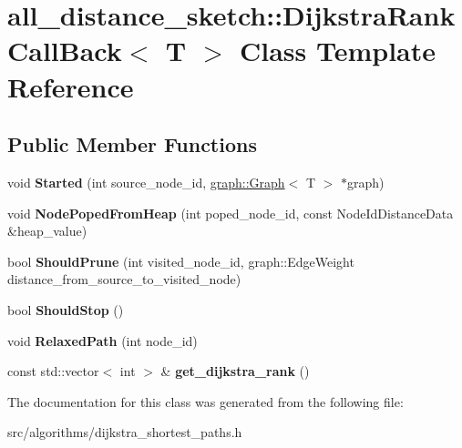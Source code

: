 \hypertarget{classall__distance__sketch_1_1DijkstraRankCallBack}{}\section{all\+\_\+distance\+\_\+sketch\+:\+:Dijkstra\+Rank\+Call\+Back$<$ T $>$ Class Template Reference}
\label{classall__distance__sketch_1_1DijkstraRankCallBack}
\subsection*{Public Member Functions}
\begin{DoxyCompactItemize}
\item 
\hypertarget{classall__distance__sketch_1_1DijkstraRankCallBack_a7a4c681a870394604e05cdf064df78c8}{}void {\bfseries Started} (int source\+\_\+node\+\_\+id, \hyperlink{classall__distance__sketch_1_1graph_1_1Graph}{graph\+::\+Graph}$<$ T $>$ $\ast$graph)\label{classall__distance__sketch_1_1DijkstraRankCallBack_a7a4c681a870394604e05cdf064df78c8}

\item 
\hypertarget{classall__distance__sketch_1_1DijkstraRankCallBack_ace8ff96d4d857a62ddd7aaab0dedc810}{}void {\bfseries Node\+Poped\+From\+Heap} (int poped\+\_\+node\+\_\+id, const Node\+Id\+Distance\+Data \&heap\+\_\+value)\label{classall__distance__sketch_1_1DijkstraRankCallBack_ace8ff96d4d857a62ddd7aaab0dedc810}

\item 
\hypertarget{classall__distance__sketch_1_1DijkstraRankCallBack_aa9460ecc8c9e8491eef266e13053a3cc}{}bool {\bfseries Should\+Prune} (int visited\+\_\+node\+\_\+id, graph\+::\+Edge\+Weight distance\+\_\+from\+\_\+source\+\_\+to\+\_\+visited\+\_\+node)\label{classall__distance__sketch_1_1DijkstraRankCallBack_aa9460ecc8c9e8491eef266e13053a3cc}

\item 
\hypertarget{classall__distance__sketch_1_1DijkstraRankCallBack_a05afa9500175d6b2a3aaf60eba63a37f}{}bool {\bfseries Should\+Stop} ()\label{classall__distance__sketch_1_1DijkstraRankCallBack_a05afa9500175d6b2a3aaf60eba63a37f}

\item 
\hypertarget{classall__distance__sketch_1_1DijkstraRankCallBack_acb2c46968a9027830b3d45b3da4fefd7}{}void {\bfseries Relaxed\+Path} (int node\+\_\+id)\label{classall__distance__sketch_1_1DijkstraRankCallBack_acb2c46968a9027830b3d45b3da4fefd7}

\item 
\hypertarget{classall__distance__sketch_1_1DijkstraRankCallBack_a6df5bd21ea32819a658f8dd3be2ecb44}{}const std\+::vector$<$ int $>$ \& {\bfseries get\+\_\+dijkstra\+\_\+rank} ()\label{classall__distance__sketch_1_1DijkstraRankCallBack_a6df5bd21ea32819a658f8dd3be2ecb44}

\end{DoxyCompactItemize}


The documentation for this class was generated from the following file\+:\begin{DoxyCompactItemize}
\item 
src/algorithms/dijkstra\+\_\+shortest\+\_\+paths.\+h\end{DoxyCompactItemize}
